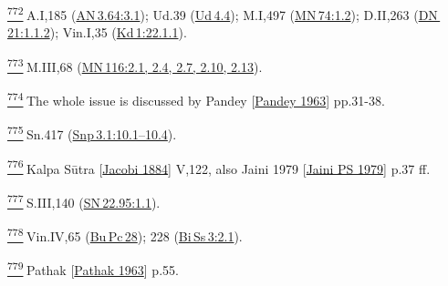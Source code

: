 \label{footprints_split_025.html_fn772}
\hyperref[footprints_split_019.htmlux5cux23fnref772]{\textsuperscript{772}} A.I,185
(\href{https://suttacentral.net/an3.64/en/sujato\#3.1}{AN\,3.64:3.1});
Ud.39 (\href{https://suttacentral.net/ud4.4/en/sujato}{Ud\,4.4});
M.I,497
(\href{https://suttacentral.net/mn74/en/sujato\#1.2}{MN\,74:1.2});
D.II,263
(\href{https://suttacentral.net/dn21/en/sujato\#1.1.2}{DN\,21:1.1.2});
Vin.I,35
(\href{https://suttacentral.net/pli-tv-kd1/en/brahmali\#22.1.1}{Kd\,1:22.1.1}).

\label{footprints_split_025.html_fn773}
\hyperref[footprints_split_019.htmlux5cux23fnref773]{\textsuperscript{773}} M.III,68
(\href{https://suttacentral.net/mn116/en/sujato\#2.1}{MN\,116:2.1, 2.4,
2.7, 2.10, 2.13}).

\label{footprints_split_025.html_fn774}
\hyperref[footprints_split_019.htmlux5cux23fnref774]{\textsuperscript{774}} The
whole issue is discussed by {Pandey
{{[}\hyperref[footprints_split_022.htmlux5cux23Pandeyux5cux25201963]{Pandey
1963}{]}}} pp.31-38.

\label{footprints_split_025.html_fn775}
\hyperref[footprints_split_019.htmlux5cux23fnref775]{\textsuperscript{775}} Sn.417
(\href{https://suttacentral.net/snp3.1/en/sujato\#10.1}{Snp\,3.1:10.1--10.4}).

\label{footprints_split_025.html_fn776}
\hyperref[footprints_split_019.htmlux5cux23fnref776]{\textsuperscript{776}} {Kalpa
Sūtra
{{[}\hyperref[footprints_split_022.htmlux5cux23Jacobiux5cux25201884]{Jacobi
1884}{]}}} V,122, also {Jaini 1979
{{[}\hyperref[footprints_split_022.htmlux5cux23Jainiux5cux2520PSux5cux25201979]{Jaini
PS 1979}{]}}} p.37 ff.

\label{footprints_split_025.html_fn777}
\hyperref[footprints_split_019.htmlux5cux23fnref777]{\textsuperscript{777}} S.III,140
(\href{https://suttacentral.net/sn22.95/en/sujato\#1.1}{SN\,22.95:1.1}).

\label{footprints_split_025.html_fn778}
\hyperref[footprints_split_019.htmlux5cux23fnref778]{\textsuperscript{778}} Vin.IV,65
(\href{https://suttacentral.net/pli-tv-bu-vb-pc28/en/brahmali\#2.1}{Bu\,Pc\,28});
228
(\href{https://suttacentral.net/pli-tv-bi-vb-ss3/en/brahmali\#2.1}{Bi\,Ss\,3:2.1}).

\label{footprints_split_025.html_fn779}
\hyperref[footprints_split_019.htmlux5cux23fnref779]{\textsuperscript{779}} {Pathak
{{[}\hyperref[footprints_split_022.htmlux5cux23Pathakux5cux25201963]{Pathak
1963}{]}}} p.55.

